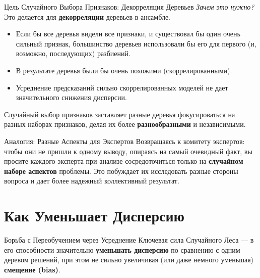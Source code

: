 \begin{textbox}{Цель Случайного Выбора Признаков: Декорреляция Деревьев}
    \textit{Зачем это нужно?} Это делается для \textbf{декорреляции} деревьев в ансамбле.
    \begin{itemize}[nosep, leftmargin=*]
        \item Если бы все деревья видели все признаки, и существовал бы один очень сильный признак, большинство деревьев использовали бы его для первого (и, возможно, последующих) разбиений.
        \item В результате деревья были бы очень похожими (скоррелированными).
        \item Усреднение предсказаний сильно скоррелированных моделей не дает значительного снижения дисперсии.
    \end{itemize}
    Случайный выбор признаков заставляет разные деревья фокусироваться на разных наборах признаков, делая их более \textbf{разнообразными} и независимыми.
\end{textbox}

\begin{myexampleblock}{Аналогия: Разные Аспекты для Экспертов}
    Возвращаясь к комитету экспертов: чтобы они не пришли к одному выводу, опираясь на самый очевидный факт, вы просите каждого эксперта при анализе сосредоточиться только на \textbf{случайном наборе аспектов} проблемы. Это побуждает их исследовать разные стороны вопроса и дает более надежный коллективный результат.
\end{myexampleblock}

\section{Как Уменьшает Дисперсию}

\begin{myblock}{Борьба с Переобучением через Усреднение}
    Ключевая сила Случайного Леса — в его способности значительно \textbf{уменьшать дисперсию} по сравнению с одним деревом решений, при этом не сильно увеличивая (или даже немного уменьшая) \textbf{смещение (bias)}.
\end{myblock}

